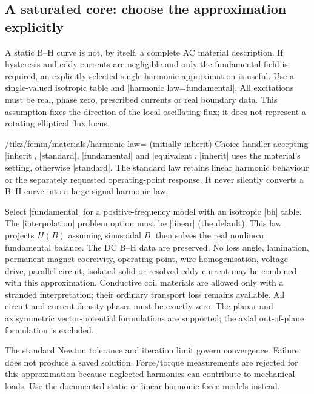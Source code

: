 \subsection{A saturated core: choose the approximation explicitly}
\label{sec:fundamental-law}
A static B--H curve is not, by itself, a complete AC material description.
If hysteresis and eddy currents are negligible and only the fundamental field
is required, an explicitly selected single-harmonic approximation is useful.
Use a single-valued isotropic table and |harmonic law=fundamental|. All
excitations must be real, phase zero, prescribed currents or real boundary data.
This assumption fixes the direction of the local oscillating flux; it does not
represent a rotating elliptical flux locus.

\begin{key}{/tikz/femm/materials/harmonic law= (initially inherit)}
Choice handler accepting |inherit|, |standard|, |fundamental| and |equivalent|. |inherit|
uses the material's setting, otherwise |standard|. The standard law retains
linear harmonic behaviour or the separately requested operating-point response.
It never silently converts a B--H curve into a large-signal harmonic law.

Select |fundamental| for a positive-frequency model with an isotropic |bh| table.
The |interpolation| problem option must be |linear| (the default).
This law projects $H(B)$ assuming sinusoidal
$B$, then solves the real nonlinear fundamental balance. The DC B--H data are
preserved. No loss angle, lamination, permanent-magnet coercivity, operating
point, wire homogenisation, voltage drive, parallel circuit, isolated solid or
resolved eddy current may be combined with this approximation. Conductive coil
materials are allowed only with a stranded interpretation; their ordinary
transport loss remains available. All circuit and current-density phases must
be exactly zero. The planar and axisymmetric vector-potential formulations
are supported; the axial out-of-plane formulation is excluded.

The standard Newton tolerance and iteration limit govern convergence. Failure
does not produce a saved solution. Force/torque measurements are rejected for
this approximation because neglected harmonics can contribute to mechanical
loads. Use the documented static or linear harmonic force models instead.
\end{key}


